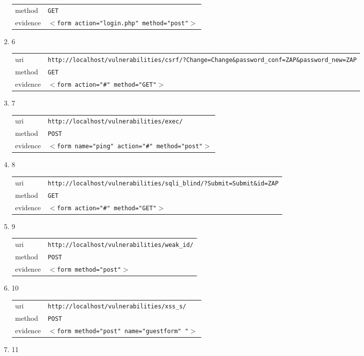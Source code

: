 \documentclass[10pt]{article}
\begin{document}
\begin{itemize}
\begin{enumerate}
\begin{tabular}{| l | p{12cm}}
method & \texttt{GET} \\
evidence & \texttt{$<$form action="login.php" method="post"$>$} \\
\end{tabular}
\item[] 6
\begin{tabular}{| l | p{12cm}}
uri & \texttt{http://localhost/vulnerabilities/csrf/?Change=Change\&password\_conf=ZAP\&password\_new=ZAP} \\
method & \texttt{GET} \\
evidence & \texttt{$<$form action="\#" method="GET"$>$} \\
\end{tabular}
\item[] 7
\begin{tabular}{| l | p{12cm}}
uri & \texttt{http://localhost/vulnerabilities/exec/} \\
method & \texttt{POST} \\
evidence & \texttt{$<$form name="ping" action="\#" method="post"$>$} \\
\end{tabular}
\item[] 8
\begin{tabular}{| l | p{12cm}}
uri & \texttt{http://localhost/vulnerabilities/sqli\_blind/?Submit=Submit\&id=ZAP} \\
method & \texttt{GET} \\
evidence & \texttt{$<$form action="\#" method="GET"$>$} \\
\end{tabular}
\item[] 9
\begin{tabular}{| l | p{12cm}}
uri & \texttt{http://localhost/vulnerabilities/weak\_id/} \\
method & \texttt{POST} \\
evidence & \texttt{$<$form method="post"$>$} \\
\end{tabular}
\item[] 10
\begin{tabular}{| l | p{12cm}}
uri & \texttt{http://localhost/vulnerabilities/xss\_s/} \\
method & \texttt{POST} \\
evidence & \texttt{$<$form method="post" name="guestform" "$>$} \\
\end{tabular}
\item[] 11
\begin{tabular}{| l | p{12cm}}

\end{tabular}
\end{enumerate}
\end{itemize}
\end{document}
